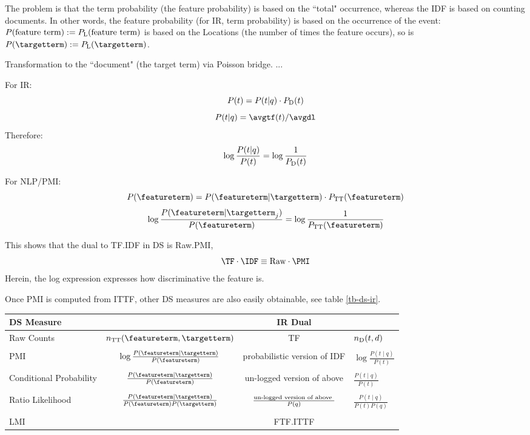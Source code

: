 The problem is that the term probability (the feature probability)
is based on the ``total" occurrence, whereas the IDF is based
on counting documents.
In other words,
the feature probability (for IR, term probability) is based on
the occurrence of the event:
$P(\textmd{feature term}):=P_{\textmd{L}}(\textmd{feature term})$
is based on the Locations (the number of times the feature occurs), so is
$P(\targetterm):=P_{\textmd{L}}(\targetterm)$.

Transformation to the ``document" (the target term) via Poisson bridge.
...

For IR:
\[
P(t) = P(t|q) \cdot P_{\textmd{D}}(t)
\]
\[
P(t|q) = \avgtf(t) / \avgdl
\]
Therefore:
\[
\log\frac{P(t|q)}{P(t)} = \log\frac{1}{P_{\textmd{D}}(t)}
\]

For NLP/PMI:
\[
P(\featureterm) = P(\featureterm|\targetterm) \cdot P_\textmd{TT}(\featureterm)
\]
\begin{equation}
\label{eq:pmi-log}
\log\frac{P(\featureterm|\targetterm_j)}{P(\featureterm)} = \log\frac{1}{P_\textmd{TT}(\featureterm)}
\end{equation}

This shows that the dual to TF.IDF in DS is Raw.PMI, 
\[
\TF \cdot \IDF \equiv \textmd{Raw} \cdot \PMI
\]
Herein, the log expression expresses how discriminative the feature is. 

Once PMI is computed from ITTF, other DS measures are also easily obtainable, see  table \ref{tb-ds-ir}.
 
\begin{figure*}[htb]
  \centering
  \begin{tabular}{|l|c|c|l|}
  \hline
  DS Measure  && IR Dual &\\
  \hline
 Raw Counts  &$n_{\textmd{TT}}(\featureterm,\targetterm)$ & TF &$n_{\textmd{D}}(t,d)$\\
 &&&\\
 PMI & $\log{\frac{P(\featureterm \mid \targetterm)}{P(\featureterm)}}$  &  probabilistic version of IDF  &$\log{\frac{P(t \mid q)}{P(t)}}$\\
 &&&\\
 Conditional Probability &$ \frac{P(\featureterm \mid \targetterm)}{P(\featureterm)}$ &  un-logged version of above  &$\frac{P(t\mid q)}{P(t)}$ \\
  &&&\\
  Ratio Likelihood & $\frac{P(\featureterm \mid \targetterm)}{P(\featureterm)P(\targetterm)}$ & $\frac{\textmd{un-logged version of above }}{P(q)}$ & $\frac{P(t \mid q)}{P(t) P(q)}$ \\
 &&&\\
 LMI && FTF.ITTF&\\
  \hline
  \end{tabular}
  \caption{Nothing}
  \label{tb-ds-ir}
\end{figure*}


